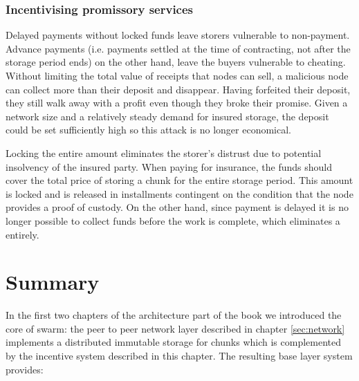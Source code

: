 \subsubsection{Incentivising promissory services}

Delayed payments without locked funds leave storers vulnerable to non-payment. Advance payments (i.e. payments settled at the time of contracting, not after the storage period ends) on the other hand, leave the buyers vulnerable to cheating. Without limiting the total value of receipts that nodes can sell, a malicious node can collect more than their deposit and disappear. Having forfeited their deposit, they still walk away with a profit even though they broke their promise. Given a network size and a relatively steady demand for insured storage, the deposit could be set sufficiently high so this attack is no longer economical.

Locking the entire amount eliminates the storer's distrust due to potential insolvency of the insured party. When paying for insurance, the funds should cover the total price of storing a chunk for the entire storage period. This amount is locked and is released in installments contingent on the condition that the node provides a proof of custody. On the other hand, since payment is delayed it is no longer possible to collect funds before the work is complete, which eliminates a  entirely.

\section{Summary}


In the first two chapters of the architecture part of the book we introduced the core of swarm: the peer to peer network layer described in chapter \ref{sec:network} implements a distributed immutable storage for chunks which is complemented by the incentive system described in this chapter. The resulting base layer system provides:

